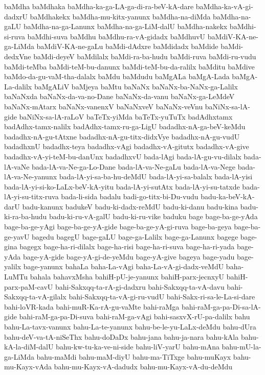{baMdha
baMdhaka
baMdha-ka-ga-LA-ga-di-ra-beV-kA-dare
baMdha-ka-vA-gi-dadxrU
baMdhakekx
baMdha-mu-kitx-yanunx
baMdha-na-diMda
baMdha-na-gaLU
baMdha-na-ga-Lanunx
baMdha-na-ga-LiM-dalU
baMdha-nakekx
baMdhi-si-ruva
baMdhi-suva
baMdhu
baMdhu-ra-vA-gidadx
baMdhuvU
baMdiV-KA-ne-ga-LiMda
baMdiV-KA-ne-gaLu
baMdi-dAdxre
baMdidadx
baMdide
baMdi-dedxVne
baMdi-deyeV
baMdilalx
baMdi-ra-ba-hudu
baMdi-ruva
baMdi-ru-vudu
baMdi-teMba
baMdi-teM-bu-danunx
baMdi-teM-bu-da-ralilx
baMditu
baMdive
baMdo-da-gu-vaM-tha-dalalx
baMdu
baMdudu
baMgALa
baMgA-Lada
baMgA-La-dalilx
baMgALiV
baMjeya
baMtu
baNaNx
baNaNx-ba-NaNx-ga-Lalilx
baNaNxda
baNaNx-da-va-no-Dane
baNaNx-da-vanu
baNaNx-ga-LeMdeV
baNaNx-mAtarx
baNaNx-vanenxV
baNaNxveV
baNaNx-veVnu
baNiNx-sa-lA-gide
baNiNx-sa-lA-raLoV
baTeTx-yiMda
baTeTx-yuTuTx
badAdhxtamx
badAdhx-tamx-nalilx
badAdhx-tamx-ru-ga-LigU
badadhx-nA-ga-beV-keMdu
badadhx-nA-gu-tAtxne
badadhx-nA-gu-titx-didxVye
badadhx-nA-gu-vudU
badadhxnU
badadhx-teya
badadhx-vAgi
badadhx-vA-gitutx
badadhx-vA-give
badadhx-vA-yi-teM-bu-danUnx
badadhxvU
bada-lAgi
bada-lA-gu-vu-dilalx
bada-lA-vaNe
bada-lA-va-Ne-ga-Lo-Dane
bada-lA-va-Ne-gaLu
bada-lA-va-Nege
bada-lA-va-Ne-yanunx
bada-lA-yi-sa-ba-hu-deMdU
bada-lA-yi-sa-balalx
bada-lA-yisi
bada-lA-yi-si-ko-LaLx-beV-kA-yitu
bada-lA-yi-sutAtx
bada-lA-yi-su-tatxde
bada-lA-yi-su-titx-ruva
bada-li-sida
badalu
badi-go-titx-bi-Du-vudu
badu-ka-beV-kA-darU
badu-kanunx
badukeV
badu-ki-dadx-reMdU
badu-ki-danu
badu-kina
badu-ki-ra-ba-hudu
badu-ki-ru-vA-galU
badu-ki-ru-vike
baduku
bage
bage-ba-ge-yAda
bage-ba-ge-yAgi
bage-ba-ge-yA-gide
bage-ba-ge-yA-gi-ruva
bage-ba-geya
bage-ba-ge-yavU
bagedu
bagegU
bage-gaLU
bage-ga-Lalilx
bage-ga-Lanunx
bagege
bage-gina
bagegx
bage-ha-ri-dilalx
bage-ha-risi
bage-ha-ri-suva
bage-ha-ri-yada
bage-yAda
bage-yA-gide
bage-yA-gi-de-yeMdu
bage-yA-give
bageya
bage-yadu
bage-yalilx
bage-yanunx
bahaLa
baha-La-vAgi
baha-La-vA-gi-dadx-veMdU
baha-LuMTu
bahala
bahavxMsha
bahiH-pU-je-yanunx
bahiH-parx-jecnxyU
bahiH-parx-paM-cavU
bahi-Sakxqq-ta-rA-gi-dadxru
bahi-Sakxqq-ta-vA-davu
bahi-Sakxqq-ta-vA-gilalx
bahi-Sakxqq-ta-vA-gi-ru-vudU
bahi-Sakx-ri-sa-le-La-si-dare
bahi-loVR-kada
bahi-muR-Ka-rA-gu-vaMte
bahi-raMga
bahi-raM-ga-pa-Di-sa-lA-gide
bahi-raM-ga-pa-Di-suva
bahi-raM-ga-vAgi
bahi-sasxvX-rU-pa-dalilx
bahu
bahu-La-tavx-vanunx
bahu-La-te-yanunx
bahu-be-le-yu-LaLx-deMdu
bahu-dUra
bahu-deV-va-tA-niSeThx
bahu-doDaDx
bahu-jana
bahu-ja-nara
bahu-kAla
bahu-kA-la-diM-dalU
bahu-kw-tu-ka-ve-ni-side
bahu-liV-yarU
bahu-mAna
bahu-mU-la-ga-LiMda
bahu-maMdi
bahu-maM-diyU
bahu-ma-TiTxge
bahu-muKayx
bahu-mu-Kayx-vAda
bahu-mu-Kayx-vA-dadudx
bahu-mu-Kayx-vA-du-deMdu
}
